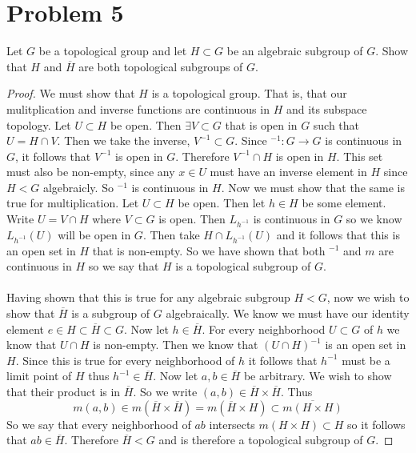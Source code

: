 \documentclass{article}
\theoremstyle{definition}
\begin{document}
\section*{Problem 5}
    \begin{mdframed}[]
        Let $G$ be a topological group and let $H \subset G$ be an algebraic subgroup of $G$.
        Show that $H$ and $\overline{H}$ are both topological subgroups of $G$.
    \end{mdframed}
    \begin{proof}
        We must show that $H$ is a topological group. That is, that our mulitplication and inverse functions 
        are continuous in $H$ and its subspace topology.
        Let $U \subset H$ be open. Then $\exists V \subset G$ that is open in $G$ such that $U = H \cap V$.
        Then we take the inverse, $V^{-1} \subset G$. Since $^{-1} : G \rightarrow G$ is continuous in $G$, it 
        follows that $V^{-1}$ is open in $G$. Therefore $V^{-1} \cap H$ is open in $H$. This set must also be non-empty,
        since any $x \in U$ must have an inverse element in $H$ since $H < G$ algebraicly. So $^{-1}$ is continuous in $H$.
        Now we must show that the same is true for multiplication. Let $U \subset H$ be open. Then let $h \in H$ be some element.
        Write $U = V \cap H$ where $V \subset G$ is open. Then $L_{h^{-1}}$ is continuous in $G$ so we know $L_{h^{-1}}(U)$
        will be open in $G$. Then take $H \cap L_{h^{-1}}(U)$ and it follows that this is an open set in $H$ that is non-empty.
        So we have shown that both $^{-1}$ and $m$ are continuous in $H$ so we say that $H$ is a topological subgroup of $G$.\\\\
        Having shown that this is true for any algebraic subgroup $H < G$, now we wish to show that $\overline {H}$ is a 
        subgroup of $G$ algebraically. We know we must have our identity element $e \in H \subset \overline{H} \subset G$.
        Now let $h \in \overline{H}$. For every neighborhood $U\subset G$ of $h$ we know that $U \cap H$ is non-empty.
        Then we know that $(U \cap H)^{-1}$ is an open set in $H$. Since this is true for every neighborhood of $h$
        it follows that $h^{-1}$ must be a limit point of $H$ thus $h^{-1} \in \overline H$. Now let $a,b \in \overline{H}$ be arbitrary.
        We wish to show that their product is in $\overline{H}$. So we write $(a,b) \in \overline{H} \times \overline{H}$.
        Thus 
        \[
            m(a,b) \in m(\overline{H} \times \overline{H}) = m(\overline{H} \times {H}) \subset \overline{m(H \times H)}
        \]
        So we say that every neighborhood of $ab$ intersects $m(H \times H) \subset H$ so it follows that $ab \in \overline{H}$.
        Therefore $\overline{H} < G$ and is therefore a topological subgroup of $G$.
    \end{proof}
\end{document}

